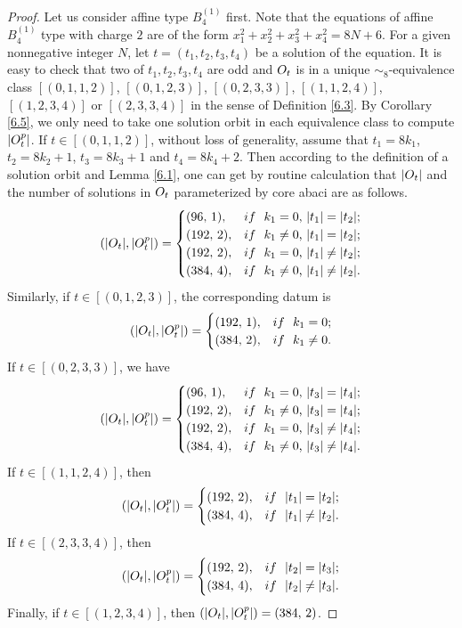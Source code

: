 \documentclass[10pt,a4paper]{amsart}
\begin{document}
\begin{proof}
Let us consider affine type $B_4^{(1)}$ first. Note that the equations 
of affine $B_4^{(1)}$ type with charge $2$ are of the form $x_1^2+x_2^2+x_3^2+x_4^2=8N+6$.
For a given nonnegative integer $N$, let $t=(t_1, t_2, t_3, t_4)$ be a solution of the equation.
It is easy to check that two of $t_1, t_2, t_3, t_4$ are odd and ${\rm O}_{t}$ is in a unique $\sim_8$-equivalence class
$[(0, 1, 1, 2)]$, $[(0, 1, 2, 3)]$, $[(0, 2, 3, 3)]$, $[(1, 1, 2, 4)]$, $[(1, 2, 3, 4)]$ or $[(2, 3, 3, 4)]$ in the sense of Definition \ref{6.3}.
By Corollary \ref{6.5}, we only need to take one solution orbit in each equivalence class to compute $|{\rm O}_t^{\rm p}|$.
If $t\in [(0, 1, 1, 2)]$, without loss of generality, assume that $t_1=8k_1$, $t_2=8k_2+1$, $t_3=8k_3+1$ and $t_4=8k_4+2$. 
Then according to the definition of a solution orbit and Lemma \ref{6.1}, one can get by routine calculation 
that $|{\rm O}_t|$ and the number of solutions in ${\rm O}_t$ parameterized by core abaci are as follows.
$$(|{\rm O}_t|, |{\rm O}_t^{\rm p}|)=
\begin{cases}
		(96,\,1),  & {\rm if \,\,}  \text{ $k_1=0$, $|t_1|=|t_2|$}; \\
		(192,\,2),  & {\rm if \,\,}  \text{ $k_1\neq 0$, $|t_1|=|t_2|$};\\
		(192,\,2),  & {\rm if \,\,}  \text{ $k_1= 0$, $|t_1|\neq|t_2|$};\\
		(384,\,4),  & {\rm if \,\,}  \text{ $k_1\neq0$, $|t_1|\neq|t_2|$}.
\end{cases}$$
Similarly, if $t\in [(0, 1, 2, 3)]$, the corresponding datum is
$$(|{\rm O}_t|, |{\rm O}_t^{\rm p}|)=
\begin{cases}
	(192,\,1),  &  {\rm if \,\,} \text{ $k_1=0$}; \\
	(384,\,2),  &  {\rm if \,\,} \text{ $k_1\neq 0$.}
\end{cases}$$
If $t\in [(0, 2, 3, 3)]$, we have
$$(|{\rm O}_t|, |{\rm O}_t^{\rm p}|)=
\begin{cases}
		(96,\,1),  & {\rm if \,\,}  \text{ $k_1=0$, $|t_3|=|t_4|$}; \\
		(192,\,2),  & {\rm if \,\,}  \text{ $k_1\neq 0$, $|t_3|=|t_4|$};\\
		(192,\,2),  & {\rm if \,\,}  \text{ $k_1= 0$, $|t_3|\neq|t_4|$};\\
		(384,\,4),  & {\rm if \,\,}  \text{ $k_1\neq0$, $|t_3|\neq|t_4|$}.
\end{cases}$$
If $t\in [(1, 1, 2, 4)]$, then
$$(|{\rm O}_t|, |{\rm O}_t^{\rm p}|)=
\begin{cases}
		(192,\,2),  & {\rm if \,\,}  \text{ $|t_1|=|t_2|$};\\
		(384,\,4),  & {\rm if \,\,}  \text{ $|t_1|\neq|t_2|$}.
\end{cases}$$
If $t\in [(2, 3, 3, 4)]$, then
$$(|{\rm O}_t|, |{\rm O}_t^{\rm p}|)=
\begin{cases}
		(192,\,2),  & {\rm if \,\,}  \text{ $|t_2|=|t_3|$};\\
		(384,\,4),  & {\rm if \,\,}  \text{ $|t_2|\neq|t_3|$}.
\end{cases}$$
Finally, if $t\in [(1, 2, 3, 4)]$, then $(|{\rm O}_t|, |{\rm O}_t^{\rm p}|)=(384, \,2)$.


\end{proof}
\end{document}
